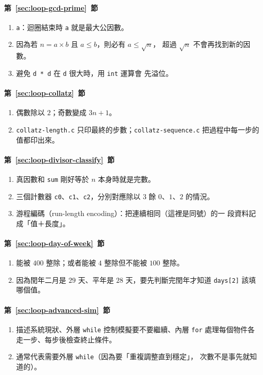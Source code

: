 \paragraph{第~\ref{sec:loop-gcd-prime}~節}
\begin{enumerate}
\item \texttt{a}：迴圈結束時 \texttt{a} 就是最大公因數。
\item 因為若 $n = a \times b$ 且 $a \le b$，則必有 $a \le \sqrt{n}$，
超過 $\sqrt{n}$ 不會再找到新的因數。
\item 避免 \texttt{d * d} 在 \texttt{d} 很大時，用 \texttt{int} 運算會
先溢位。
\end{enumerate}

\paragraph{第~\ref{sec:loop-collatz}~節}
\begin{enumerate}
\item 偶數除以 $2$；奇數變成 $3n + 1$。
\item \texttt{collatz-length.c} 只印最終的步數；\texttt{collatz-sequence.c}
把過程中每一步的值都印出來。
\end{enumerate}

\paragraph{第~\ref{sec:loop-divisor-classify}~節}
\begin{enumerate}
\item 真因數和 \texttt{sum} 剛好等於 $n$ 本身時就是完數。
\item 三個計數器 \texttt{c0}、\texttt{c1}、\texttt{c2}，分別對應除以
$3$ 餘 $0$、$1$、$2$ 的情況。
\item 游程編碼（run-length encoding）：把連續相同（這裡是同號）的一
段資料記成「值＋長度」。
\end{enumerate}

\paragraph{第~\ref{sec:loop-day-of-week}~節}
\begin{enumerate}
\item 能被 $400$ 整除；或者能被 $4$ 整除但不能被 $100$ 整除。
\item 因為閏年二月是 $29$ 天、平年是 $28$ 天，要先判斷完閏年才知道
\texttt{days[2]} 該填哪個值。
\end{enumerate}

\paragraph{第~\ref{sec:loop-advanced-sim}~節}
\begin{enumerate}
\item 描述系統現狀、外層 \texttt{while} 控制模擬要不要繼續、內層
\texttt{for} 處理每個物件各走一步、每步後檢查終止條件。
\item 通常代表需要外層 \texttt{while}（因為要「重複調整直到穩定」，
次數不是事先就知道的）。
\end{enumerate}
